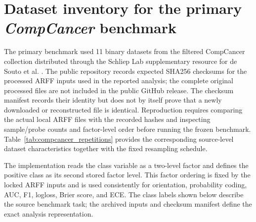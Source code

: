 \documentclass[11pt, a4paper]{article}
\begin{document}
\section{Dataset inventory for the primary \emph{CompCancer} benchmark}

The primary benchmark used 11 binary datasets from the filtered CompCancer collection distributed through the Schliep Lab supplementary resource for de Souto et al. \cite{deSouto2008}. The public repository records expected SHA256 checksums for the processed ARFF inputs used in the reported analysis; the complete original processed files are not included in the public GitHub release. The checksum manifest records their identity but does not by itself prove that a newly downloaded or reconstructed file is identical. Reproduction requires comparing the actual local ARFF files with the recorded hashes and inspecting sample/probe counts and factor-level order before running the frozen benchmark. Table~\ref{tab:compcancer_repetitions} provides the corresponding source-level dataset characteristics together with the fixed resampling schedule.

The implementation reads the class variable as a two-level factor and defines the positive class as its second stored factor level. This factor ordering is fixed by the locked ARFF inputs and is used consistently for orientation, probability coding, AUC, F1, logloss, Brier score, and ECE. The class labels shown below describe the source benchmark task; the archived inputs and checksum manifest define the exact analysis representation.
\end{document}
